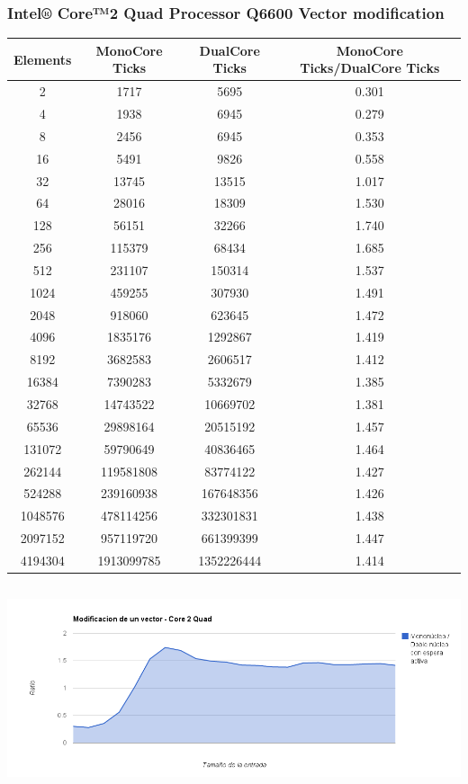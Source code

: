 \subsubsection{Intel® Core™2 Quad Processor Q6600 Vector modification}
\begin{center}
	\begin{tabular}{|c|c|c|c|}
		\hline	
			Elements & MonoCore Ticks & DualCore Ticks & MonoCore Ticks/DualCore Ticks\\
		\hline
				2 & 1717 & 5695 & 0.301\\
		\hline
				4 & 1938 & 6945 & 0.279\\
		\hline
				8 & 2456 & 6945 & 0.353\\
		\hline
				16 & 5491 & 9826 & 0.558\\
		\hline
				32 & 13745 & 13515 & 1.017\\
		\hline
				64 & 28016 & 18309 & 1.530\\
		\hline
				128 & 56151 & 32266 & 1.740\\
		\hline
				256 & 115379 & 68434 & 1.685\\
		\hline
				512 & 231107 & 150314 & 1.537\\
		\hline
				1024 & 459255 & 307930 & 1.491\\
		\hline
				2048 & 918060 & 623645 & 1.472\\
		\hline
				4096 & 1835176 & 1292867 & 1.419\\
		\hline
				8192 & 3682583 & 2606517 & 1.412\\
		\hline
				16384 & 7390283 & 5332679 & 1.385\\
		\hline
				32768 & 14743522 & 10669702 & 1.381\\
		\hline
				65536 & 29898164 & 20515192 & 1.457\\
		\hline
				131072 & 59790649 & 40836465 & 1.464\\
		\hline
				262144 & 119581808 & 83774122 & 1.427\\
		\hline
				524288 & 239160938 & 167648356 & 1.426\\
		\hline
				1048576 & 478114256 & 332301831 & 1.438\\
		\hline
				2097152 & 957119720 & 661399399 & 1.447\\
		\hline
				4194304 & 1913099785 & 1352226444 & 1.414\\
		\hline
	\end{tabular}
\end{center}
	\begin{center}
	    \includegraphics[height=6cm]{images/core2quad_sum.png}
	\end{center}

